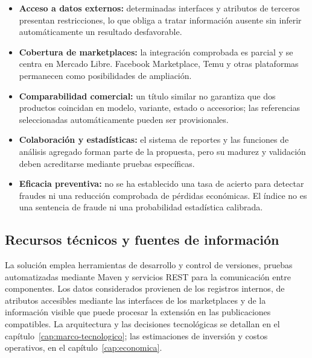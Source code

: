 \begin{itemize}
    \item \textbf{Acceso a datos externos:} determinadas interfaces y atributos de terceros presentan restricciones, lo que obliga a tratar información ausente sin inferir automáticamente un resultado desfavorable.
    \item \textbf{Cobertura de marketplaces:} la integración comprobada es parcial y se centra en Mercado Libre. Facebook Marketplace, Temu y otras plataformas permanecen como posibilidades de ampliación.
    \item \textbf{Comparabilidad comercial:} un título similar no garantiza que dos productos coincidan en modelo, variante, estado o accesorios; las referencias seleccionadas automáticamente pueden ser provisionales.
    \item \textbf{Colaboración y estadísticas:} el sistema de reportes y las funciones de análisis agregado forman parte de la propuesta, pero su madurez y validación deben acreditarse mediante pruebas específicas.
    \item \textbf{Eficacia preventiva:} no se ha establecido una tasa de acierto para detectar fraudes ni una reducción comprobada de pérdidas económicas. El índice no es una sentencia de fraude ni una probabilidad estadística calibrada.
\end{itemize}

\subsection{Recursos técnicos y fuentes de información}\label{subsec:ml-recursos}

La solución emplea herramientas de desarrollo y control de versiones, pruebas automatizadas mediante Maven y servicios REST para la comunicación entre componentes. Los datos considerados provienen de los registros internos, de atributos accesibles mediante las interfaces de los marketplaces y de la información visible que puede procesar la extensión en las publicaciones compatibles. La arquitectura y las decisiones tecnológicas se detallan en el capítulo~\ref{cap:marco-tecnologico}; las estimaciones de inversión y costos operativos, en el capítulo~\ref{cap:economica}.

